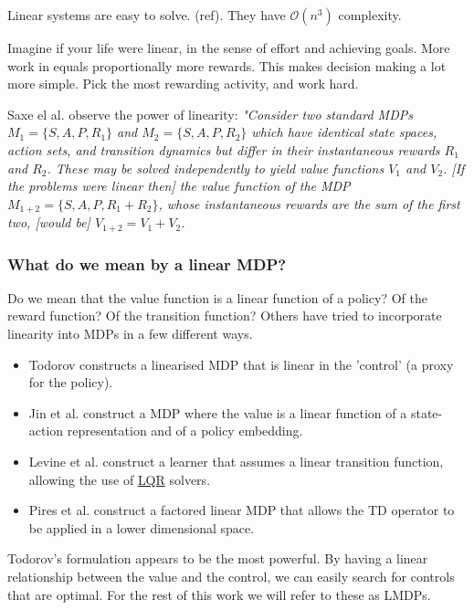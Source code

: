 Linear systems are easy to solve. (ref). They have $\mathcal O(n^3)$ complexity.

Imagine if your life were linear, in the sense of effort and achieving goals.
More work in equals proportionally more rewards. This makes decision making
a lot more simple. Pick the most rewarding activity, and work hard.

Saxe el al. observe the power of linearity: \textit{"Consider two standard MDPs
$M_1 = \{S, A, P, R_1\}$ and $M_2 = \{S, A, P, R_2\}$ which have
identical state spaces, action sets, and transition dynamics but differ in their
instantaneous rewards $R_1$ and $R_2$. These may be solved independently to
yield value functions $V_1$ and $V_2$. [If the problems were linear then] the value function of the MDP
$M_{1+2} = \{S, A, P, R_1 +R_2\}$, whose instantaneous rewards are the sum of the
first two, [would be] $V_{1+2} = V_1 + V_2$.} \cite{Saxea}

\subsubsection{What do we mean by a linear MDP?}

Do we mean that the value function is a linear function of a policy?
Of the reward function? Of the transition function? Others have tried to incorporate
linearity into MDPs in a few different ways.

\begin{itemize}
  \tightlist
  \item Todorov constructs a linearised MDP that is linear in the 'control' (a proxy for the policy)\cite{Todorov2006}.
  \item Jin et al. construct a MDP where the value is a linear function of a state-action representation and of a policy embedding\cite{Wang}.
  \item Levine et al. construct a learner that assumes a linear transition function, allowing the use of \href{https://en.wikipedia.org/wiki/Linear%E2%80%93quadratic_regulator}{LQR} solvers\cite{Levine2019}.
  \item Pires et al. construct a factored linear MDP that allows the TD operator to be applied in a lower dimensional space\cite{Pires2016}.
\end{itemize}

Todorov's formulation appears to be the most powerful. By having a linear
relationship between the value and the control, we can easily search for controls that
are optimal. For the rest of this work we will refer to these as LMDPs.

